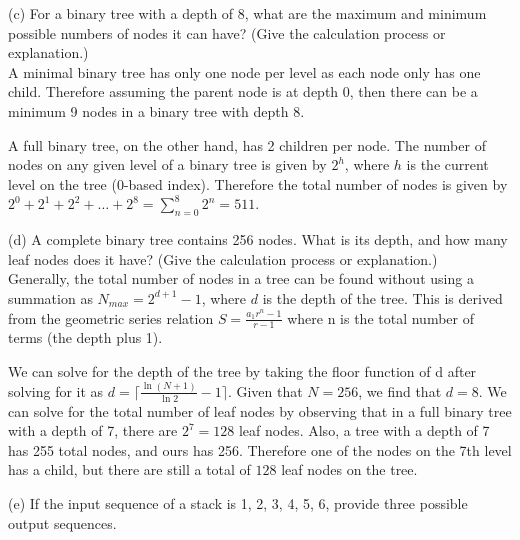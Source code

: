 \documentclass[12pt]{article}
\newcommand{\ceil}[1]{\lceil {#1} \rceil}
\newcommand{\paren}[1]{\left( {#1} \right)}
\newcommand{\series}[2]{\sum_{ {#1} }^{ {#2} }}
\begin{document}
\noindent \hdashrule[0.5ex]{\textwidth}{1pt}{3mm 2mm}

\noindent (c) For a binary tree with a depth of 8, what are the maximum and minimum possible numbers of nodes it can have? (Give the calculation process or explanation.) \\

\indent A minimal binary tree has only one node per level as each node only has one child. Therefore assuming the parent node is at depth 0, then there can be a minimum 9 nodes in a binary tree with depth $\boxed{8}$.

\indent A full binary tree, on the other hand, has 2 children per node. The number of nodes on any given level of a binary tree is given by $2^h$, where $h$ is the current level on the tree (0-based index). Therefore the total number of nodes is given by $2^0 + 2^1+2^2+\dots+2^8=\series{n=0}{8}2^n=\boxed{511}$.

\newpage

\noindent (d) A complete binary tree contains 256 nodes. What is its depth, and how many leaf nodes does it have? (Give the calculation process or explanation.) \\

\indent Generally, the total number of nodes in a tree can be found without using a summation as $N_{max}=2^{d+1}-1$, where $d$ is the depth of the tree. This is derived from the geometric series relation $S=\frac{a_1r^n-1}{r-1}$ where n is the total number of terms (the depth plus 1).

\indent We can solve for the depth of the tree by taking the floor function of d after solving for it as $d=\ceil{\frac{\ln\paren{N+1}}{\ln2}-1}$. Given that $N=256$, we find that $\boxed{d=8}$. We can solve for the total number of leaf nodes by observing that in a full binary tree with a depth of 7, there are $2^7=128$ leaf nodes. Also, a tree with a depth of 7 has 255 total nodes, and ours has 256. Therefore one of the nodes on the 7th level has a child, but there are still a total of $\boxed{128}$ leaf nodes on the tree.

\noindent \hdashrule[0.5ex]{\textwidth}{1pt}{3mm 2mm}

\noindent (e) If the input sequence of a stack is 1, 2, 3, 4, 5, 6, provide three possible output sequences.
\end{document}
